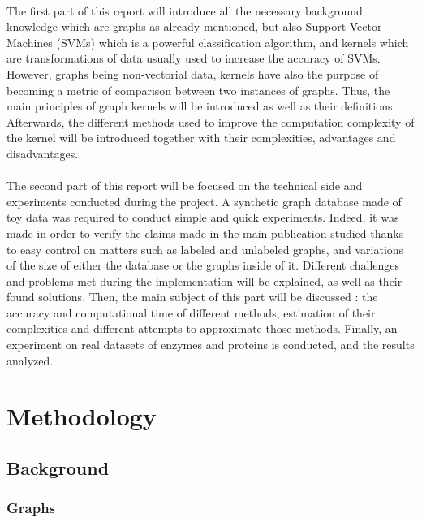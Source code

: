 \documentclass{article}
\theoremstyle{definition}
\begin{document}
 \paragraph{}The first part of this report will introduce all the necessary background knowledge which are graphs as already mentioned, but also Support Vector Machines (SVMs) which is a powerful classification algorithm, and kernels which are transformations of data usually used to increase the accuracy of SVMs. However, graphs being non-vectorial data, kernels have also the purpose of becoming a metric of comparison between two instances of graphs. Thus, the main principles of graph kernels will be introduced as well as their definitions. Afterwards, the different methods used to improve the computation complexity of the kernel will be introduced together with their complexities, advantages and disadvantages.
\paragraph{}The second part of this report will be focused on the technical side and experiments conducted during the project. A synthetic graph database made of toy data was required to conduct simple and quick experiments. Indeed, it was made in order to verify the claims made in the main publication studied thanks to easy control on matters such as labeled and unlabeled graphs, and variations of the size of either the database or the graphs inside of it. Different challenges and problems met during the implementation will be explained, as well as their found solutions. Then, the main subject of this part will be discussed : the accuracy and computational time of different methods, estimation of their complexities and different attempts to approximate those methods. Finally, an experiment on real datasets of enzymes and proteins is conducted, and the results analyzed.

\newpage
\section{Methodology}
\subsection{Background}
\subsubsection{Graphs}
\end{document}
